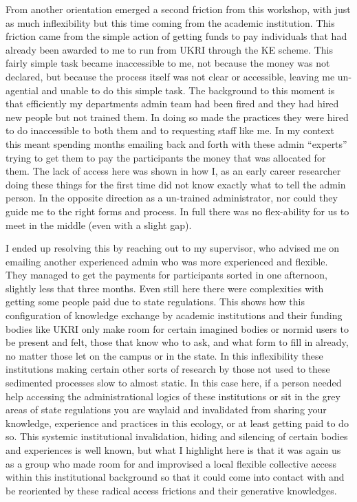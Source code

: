 From another orientation emerged a second friction from this workshop,
with just as much inflexibility but this time coming from the academic
institution. This friction came from the simple action of getting funds
to pay individuals that had already been awarded to me to run from UKRI
through the KE scheme. This fairly simple task became inaccessible to
me, not because the money was not declared, but because the process
itself was not clear or accessible, leaving me un-agential and unable to
do this simple task. The background to this moment is that efficiently
my departments admin team had been fired and they had hired new people
but not trained them. In doing so made the practices they were hired to
do inaccessible to both them and to requesting staff like me. In my
context this meant spending months emailing back and forth with these
admin ``experts'' trying to get them to pay the participants the money
that was allocated for them. The lack of access here was shown in how I,
as an early career researcher doing these things for the first time did
not know exactly what to tell the admin person. In the opposite
direction as a un-trained administrator, nor could they guide me to the
right forms and process. In full there was no flex-ability for us to
meet in the middle (even with a slight gap).

I ended up resolving this by reaching out to my supervisor, who advised
me on emailing another experienced admin who was more experienced and
flexible. They managed to get the payments for participants sorted in
one afternoon, slightly less that three months. Even still here there
were complexities with getting some people paid due to state
regulations. This shows how this configuration of knowledge exchange by
academic institutions and their funding bodies like UKRI only make room
for certain imagined bodies or normid users to be present and felt,
those that know who to ask, and what form to fill in already, no matter
those let on the campus or in the state. In this inflexibility these
institutions making certain other sorts of research by those not used to
these sedimented processes slow to almost static. In this case here, if
a person needed help accessing the administrational logics of these
institutions or sit in the grey areas of state regulations you are
waylaid and invalidated from sharing your knowledge, experience and
practices in this ecology, or at least getting paid to do so. This
systemic institutional invalidation, hiding and silencing of certain
bodies and experiences is well known, but what I highlight here is that
it was again us as a group who made room for and improvised a local
flexible collective access within this institutional background so that
it could come into contact with and be reoriented by these radical
access frictions and their generative knowledges.

